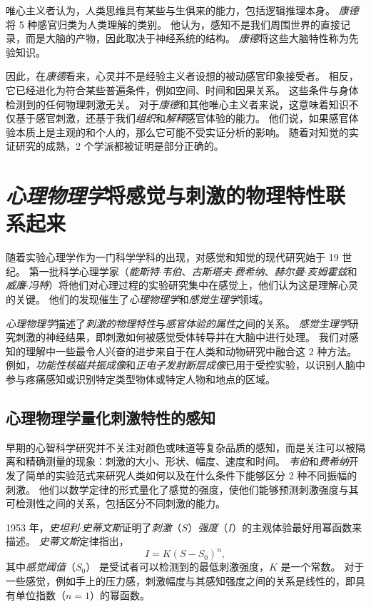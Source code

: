 唯心主义者认为，人类思维具有某些与生俱来的能力，包括逻辑推理本身。
\textit{康德}将 5 种感官归类为人类理解的类别。
他认为，感知不是我们周围世界的直接记录，而是大脑的产物，因此取决于神经系统的结构。
\textit{康德}将这些大脑特性称为先验知识。


因此，在\textit{康德}看来，心灵并不是经验主义者设想的被动感官印象接受者。
相反，它已经进化为符合某些普遍条件，例如空间、时间和因果关系。
这些条件与身体检测到的任何物理刺激无关。 
对于\textit{康德}和其他唯心主义者来说，这意味着知识不仅基于感官刺激，还基于我们\textit{组织}和\textit{解释}感官体验的能力。
他们说，如果感官体验本质上是主观的和个人的，那么它可能不受实证分析的影响。
随着对知觉的实证研究的成熟，2 个学派都被证明是部分正确的。



\section{\textit{心理物理学}将感觉与刺激的物理特性联系起来}

随着实验心理学作为一门科学学科的出现，对感觉和知觉的现代研究始于 19 世纪。
第一批科学心理学家（\textit{能斯特$\cdot$韦伯}、\textit{古斯塔夫$\cdot$费希纳}、\textit{赫尔曼$\cdot$亥姆霍兹}和\textit{威廉$\cdot$冯特}）将他们对心理过程的实验研究集中在感觉上，他们认为这是理解心灵的关键。
他们的发现催生了\textit{心理物理学}和\textit{感觉生理学}领域。


\textit{心理物理学}描述了\textit{刺激的物理特性}与\textit{感官体验的属性}之间的关系。 
\textit{感觉生理学}研究刺激的神经结果，即刺激如何被感觉受体转导并在大脑中进行处理。
我们对感知的理解中一些最令人兴奋的进步来自于在人类和动物研究中融合这 2 种方法。
例如，\textit{功能性核磁共振成像}和\textit{正电子发射断层成像}已用于受控实验，以识别人脑中参与疼痛感知或识别特定类型物体或特定人物和地点的区域。


\subsection{心理物理学量化刺激特性的感知}

早期的心智科学研究并不关注对颜色或味道等复杂品质的感知，而是关注可以被隔离和精确测量的现象：刺激的大小、形状、幅度、速度和时间。
\textit{韦伯}和\textit{费希纳}开发了简单的实验范式来研究人类如何以及在什么条件下能够区分 2 种不同振幅的刺激。
他们以数学定律的形式量化了感觉的强度，使他们能够预测刺激强度与其可检测性之间的关系，包括区分不同刺激的能力。


1953 年，\textit{史坦利$\cdot$史蒂文斯}证明了\textit{刺激}（$ S $）\textit{强度}（$ I $）的主观体验最好用幂函数来描述。 
\textit{史蒂文斯}定律指出，
\begin{equation}
	I = K(S-S_0)^n,
\end{equation}
其中\textit{感觉阈值}（$ S_0 $） 是受试者可以检测到的最低刺激强度，$K$ 是一个常数。 
对于一些感觉，例如手上的压力感，刺激幅度与其感知强度之间的关系是线性的，即具有单位指数（$ n = 1 $）的幂函数。


